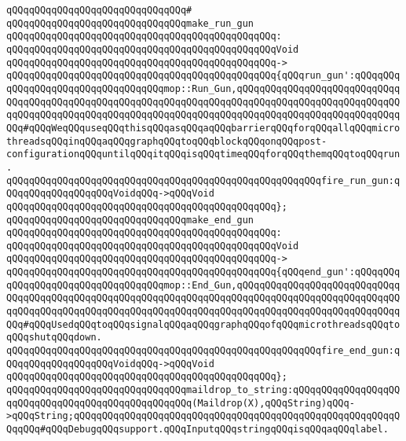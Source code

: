 \verb|qQQqqQQqqQQqqQQqqQQqqQQqqQQqqQQq#|\newline
\verb|qQQqqQQqqQQqqQQqqQQqqQQqqQQqqQQqmake_run_gun|\newline
\verb|qQQqqQQqqQQqqQQqqQQqqQQqqQQqqQQqqQQqqQQqqQQqqQQq:|\newline
\verb|qQQqqQQqqQQqqQQqqQQqqQQqqQQqqQQqqQQqqQQqqQQqqQQqVoid|\newline
\verb|qQQqqQQqqQQqqQQqqQQqqQQqqQQqqQQqqQQqqQQqqQQqqQQq->|\newline
\verb|qQQqqQQqqQQqqQQqqQQqqQQqqQQqqQQqqQQqqQQqqQQqqQQq{qQQqrun_gun':qQQqqQQqqQQqqQQqqQQqqQQqqQQqqQQqqQQqmop::Run_Gun,qQQqqQQqqQQqqQQqqQQqqQQqqQQqqQQqqQQqqQQqqQQqqQQqqQQqqQQqqQQqqQQqqQQqqQQqqQQqqQQqqQQqqQQqqQQqqQQqqQQqqQQqqQQqqQQqqQQqqQQqqQQqqQQqqQQqqQQqqQQqqQQqqQQqqQQqqQQqqQQqqQQqqQQqqQQq#qQQqWeqQQquseqQQqthisqQQqasqQQqaqQQqbarrierqQQqforqQQqallqQQqmicrothreadsqQQqinqQQqaqQQqgraphqQQqtoqQQqblockqQQqonqQQqpost-configurationqQQquntilqQQqitqQQqisqQQqtimeqQQqforqQQqthemqQQqtoqQQqrun.|\newline
\verb|qQQqqQQqqQQqqQQqqQQqqQQqqQQqqQQqqQQqqQQqqQQqqQQqqQQqqQQqfire_run_gun:qQQqqQQqqQQqqQQqqQQqVoidqQQq->qQQqVoid|\newline
\verb|qQQqqQQqqQQqqQQqqQQqqQQqqQQqqQQqqQQqqQQqqQQqqQQq};|\newline
\newline
\verb|qQQqqQQqqQQqqQQqqQQqqQQqqQQqqQQqmake_end_gun|\newline
\verb|qQQqqQQqqQQqqQQqqQQqqQQqqQQqqQQqqQQqqQQqqQQqqQQq:|\newline
\verb|qQQqqQQqqQQqqQQqqQQqqQQqqQQqqQQqqQQqqQQqqQQqqQQqVoid|\newline
\verb|qQQqqQQqqQQqqQQqqQQqqQQqqQQqqQQqqQQqqQQqqQQqqQQq->|\newline
\verb|qQQqqQQqqQQqqQQqqQQqqQQqqQQqqQQqqQQqqQQqqQQqqQQq{qQQqend_gun':qQQqqQQqqQQqqQQqqQQqqQQqqQQqqQQqqQQqmop::End_Gun,qQQqqQQqqQQqqQQqqQQqqQQqqQQqqQQqqQQqqQQqqQQqqQQqqQQqqQQqqQQqqQQqqQQqqQQqqQQqqQQqqQQqqQQqqQQqqQQqqQQqqQQqqQQqqQQqqQQqqQQqqQQqqQQqqQQqqQQqqQQqqQQqqQQqqQQqqQQqqQQqqQQqqQQqqQQq#qQQqUsedqQQqtoqQQqsignalqQQqaqQQqgraphqQQqofqQQqmicrothreadsqQQqtoqQQqshutqQQqdown.|\newline
\verb|qQQqqQQqqQQqqQQqqQQqqQQqqQQqqQQqqQQqqQQqqQQqqQQqqQQqqQQqfire_end_gun:qQQqqQQqqQQqqQQqqQQqVoidqQQq->qQQqVoid|\newline
\verb|qQQqqQQqqQQqqQQqqQQqqQQqqQQqqQQqqQQqqQQqqQQqqQQq};|\newline
\newline
\verb|qQQqqQQqqQQqqQQqqQQqqQQqqQQqqQQqmaildrop_to_string:qQQqqQQqqQQqqQQqqQQqqQQqqQQqqQQqqQQqqQQqqQQqqQQqqQQq(Maildrop(X),qQQqString)qQQq->qQQqString;qQQqqQQqqQQqqQQqqQQqqQQqqQQqqQQqqQQqqQQqqQQqqQQqqQQqqQQqqQQqqQQq#qQQqDebugqQQqsupport.qQQqInputqQQqstringqQQqisqQQqaqQQqlabel.|\newline
